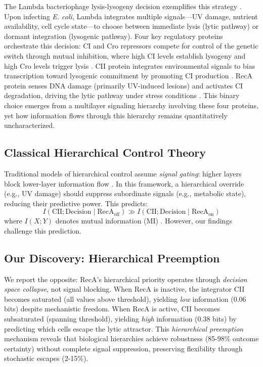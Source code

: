 \documentclass[10pt,twocolumn]{article}
\begin{document}
The Lambda bacteriophage lysis-lysogeny decision exemplifies this strategy \cite{ptashne2004}. Upon infecting \textit{E. coli}, Lambda integrates multiple signals—UV damage, nutrient availability, cell cycle state—to choose between immediate lysis (lytic pathway) or dormant integration (lysogenic pathway). Four key regulatory proteins orchestrate this decision: CI and Cro repressors compete for control of the genetic switch through mutual inhibition, where high CI levels establish lysogeny and high Cro levels trigger lysis \cite{ptashne2004,little2014}. CII protein integrates environmental signals to bias transcription toward lysogenic commitment by promoting CI production \cite{kourilsky2016}. RecA protein senses DNA damage (primarily UV-induced lesions) and activates CI degradation, driving the lytic pathway under stress conditions \cite{st-pierre2008,zeng2010}. This binary choice emerges from a multilayer signaling hierarchy involving these four proteins, yet how information flows through this hierarchy remains quantitatively uncharacterized.

\subsection{Classical Hierarchical Control Theory}

Traditional models of hierarchical control assume \textit{signal gating}: higher layers block lower-layer information flow \cite{simon1962,ferrell2012,levchenko2018}. In this framework, a hierarchical override (e.g., UV damage) should suppress subordinate signals (e.g., metabolic state), reducing their predictive power. This predicts:
\begin{equation}
I(\text{CII}; \text{Decision} \mid \text{RecA}_{\text{off}}) \gg I(\text{CII}; \text{Decision} \mid \text{RecA}_{\text{on}})
\end{equation}
where $I(X;Y)$ denotes mutual information (MI) \cite{cover2006}. However, our findings challenge this prediction.

\subsection{Our Discovery: Hierarchical Preemption}

We report the opposite: RecA's hierarchical priority operates through \textit{decision space collapse}, not signal blocking. When RecA is inactive, the integrator CII becomes saturated (all values above threshold), yielding \textit{low} information (0.06 bits) despite mechanistic freedom. When RecA is active, CII becomes subsaturated (spanning threshold), yielding \textit{high} information (0.38 bits) by predicting which cells escape the lytic attractor. This \textit{hierarchical preemption} mechanism reveals that biological hierarchies achieve robustness (85-98\% outcome certainty) without complete signal suppression, preserving flexibility through stochastic escapes (2-15\%).
\end{document}
